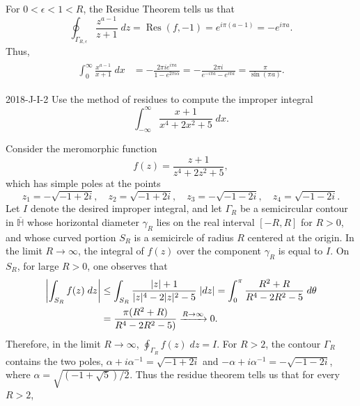 \documentclass{article}
\begin{document}
	For $0 < \epsilon < 1 < R$, the Residue Theorem tells us that 
	\begin{equation*}
		\oint_{\Gamma_{R, \epsilon}}\frac{z^{a - 1}}{z + 1}\;dz = \operatorname{Res}(f, -1) = e^{i\pi(a - 1)} = -e^{i\pi a}. 
	\end{equation*}
	Thus, 
	\begin{align*}
		\begin{split}
			\int_{0}^{\infty}\frac{x^{a-1}}{x + 1}\;dx &= -\frac{2\pi i e^{i\pi a}}{1 - e^{2\pi i \alpha}} = -\frac{2\pi i}{e^{-i\pi a} - e^{i \pi a}} = \frac{\pi}{\sin(\pi a)}. 
		\end{split}
	\end{align*}
	\begin{prb}{2018-J-I-2}
		Use the method of residues to compute the improper integral
		\begin{equation*}
			\int_{-\infty}^{\infty}\frac{x + 1}{x^{4} + 2x^{2} + 5}\;dx. 
		\end{equation*}
	\end{prb}
	Consider the meromorphic function 
	\begin{equation*}
		f(z) = \frac{z + 1}{z^{4} + 2z^{2} + 5}, 
	\end{equation*}
	which has simple poles at the points 
	\begin{equation*}
		z_{1} = -\sqrt{-1 + 2i}, \quad z_{2} = \sqrt{-1 + 2i}, \quad z_{3} = -\sqrt{-1 - 2i}, \quad z_{4} = \sqrt{-1-2i}. 
	\end{equation*}
	Let $I$ denote the desired improper integral, and let $\Gamma_{R}$ be a semicircular contour in $\overline{\mathbb{H}}$ whose horizontal diameter $\gamma_{R}$ lies on the real interval $[-R, R]$ for $R > 0$, and whose curved portion $S_{R}$ is a semicircle of radius $R$ centered at the origin. In the limit $R \to \infty$, the integral of $f(z)$ over the component $\gamma_{R}$ is equal to $I$. On $S_{R}$, for large $R > 0$, one observes that 
	\begin{align*}
		\begin{split}
			\left| \int_{S_{R}}f(z)\;dz \right| &\leq \int_{S_{R}}\frac{|z| + 1}{|z|^{4} - 2|z|^{2} - 5}\;|dz| = \int_{0}^{\pi}\frac{R^{2} + R}{R^{4} - 2R^{2} - 5}\;d\theta \\
			&= \frac{\pi (R^{2} + R)}{R^{4} - 2R^{2} - 5)} \xrightarrow{R \to \infty} 0. 
		\end{split}
	\end{align*}
	Therefore, in the limit $R \to \infty$, $\oint_{\Gamma_{R}}f(z)\;dz = I$. For $R > 2$, the contour $\Gamma_{R}$ contains the two poles, $\alpha + i\alpha^{-1} = \sqrt{-1 + 2i}$ and $-\alpha + i\alpha^{-1} = -\sqrt{-1 - 2i}$, where $\alpha = \sqrt{(-1 + \sqrt{5})/2}$. Thus the residue theorem tells us that for every $R > 2$, 
\end{document}
